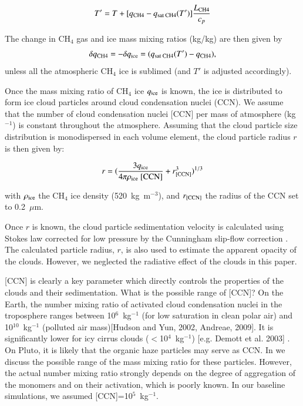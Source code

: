 \begin{equation}
T' = T + [q_{\mbox{\scriptsize CH4}} - q_{\mbox{\scriptsize sat CH4}}(T')]
\frac{L_{\mbox{\scriptsize CH4}}}{c_p} 
\end{equation}

The change in CH$_4$ gas and ice mass mixing ratios (kg/kg) are then given by 
\begin{equation}
\delta q_{\mbox{\scriptsize CH4}} = -\delta q_{\mbox{\scriptsize ice}} = (q_{\mbox{\scriptsize
sat CH4}}(T') - q_{\mbox{\scriptsize CH4}}),
\end{equation}
 unless
all the atmospheric CH$_4$ ice  is sublimed (and $T'$ is adjusted accordingly).

Once the mass mixing ratio of CH$_4$ ice $q_{\mbox{\scriptsize ice}}$ is known, the ice is
distributed to form ice cloud particles around cloud condensation nuclei (CCN).
We assume that the number of cloud condensation nuclei [CCN] per mass of atmosphere
(kg$^{-1}$) is constant throughout
the atmosphere. Assuming that the cloud particle size
distribution is monodispersed in each volume element, the cloud particle radius $r$
is then given by:


\begin{equation}
r=  (\frac{3 q_{\mbox{\scriptsize ice}}}{4\pi \rho_{\mbox{\scriptsize ice}} \ \mbox{[CCN]} } +
r_{\mbox{\scriptsize [CCN]}}^3)^{1/3}
\end{equation}

with $\rho_{\mbox{\scriptsize ice}}$ the CH$_4$ ice density (520~kg~m$^{-3}$), and
$r_{\mbox{\scriptsize [CCN]}}$ the radius of the CCN set to 0.2~$\mu$m. 

Once $r$ is known, the cloud particle sedimentation velocity 
is calculated using Stokes law
corrected for low pressure by the Cunningham slip-flow correction 
\citep{Ross:78}. 
The calculated particle radius, $r$, is also used to estimate the apparent opacity of the clouds. 
However, we neglected the radiative effect of the clouds
in this paper. 

[CCN] is clearly a key parameter which directly controls
the properties of the clouds and their sedimentation. 
What is the possible range of [CCN]? On the Earth, the number
mixing ratio of activated cloud condensation nuclei in the troposphere ranges between
10$^{6}$~kg$^{-1}$ (for low saturation in clean polar air) and
10$^{10}$~kg$^{-1}$ (polluted air mass)[Hudson and Yun, 2002, Andreae, 2009]. It
is significantly lower for icy cirrus clouds ($<$10$^{4}$~kg$^{-1}$)
[e.g. Demott et al. 2003] . On Pluto, it is likely that the organic haze particles may serve as
CCN. In \cite{Bert:16ica} we discuss the possible range of the mass mixing ratio 
for these particles.
However, the actual number mixing ratio strongly depends on the degree of aggregation of the
monomers and on their activation, which is poorly known. In our baseline simulations, we assumed 
[CCN]=10$^{5}$~kg$^{-1}$.

